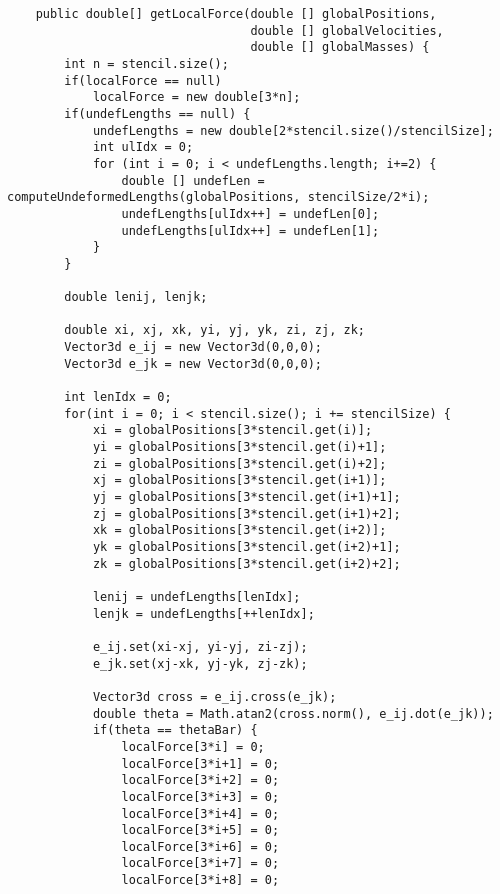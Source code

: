 \begin{lstlisting}
	public double[] getLocalForce(double [] globalPositions,
								  double [] globalVelocities,
								  double [] globalMasses) {
		int n = stencil.size();
		if(localForce == null)
			localForce = new double[3*n];
		if(undefLengths == null) {
			undefLengths = new double[2*stencil.size()/stencilSize];
			int ulIdx = 0;
			for (int i = 0; i < undefLengths.length; i+=2) {
				double [] undefLen = computeUndeformedLengths(globalPositions, stencilSize/2*i);
				undefLengths[ulIdx++] = undefLen[0];
				undefLengths[ulIdx++] = undefLen[1];
			}
		}
		
		double lenij, lenjk;
		
		double xi, xj, xk, yi, yj, yk, zi, zj, zk;
		Vector3d e_ij = new Vector3d(0,0,0);
		Vector3d e_jk = new Vector3d(0,0,0);
		
		int lenIdx = 0;
		for(int i = 0; i < stencil.size(); i += stencilSize) {
			xi = globalPositions[3*stencil.get(i)];
			yi = globalPositions[3*stencil.get(i)+1];
			zi = globalPositions[3*stencil.get(i)+2];
			xj = globalPositions[3*stencil.get(i+1)];
			yj = globalPositions[3*stencil.get(i+1)+1];
			zj = globalPositions[3*stencil.get(i+1)+2];
			xk = globalPositions[3*stencil.get(i+2)];
			yk = globalPositions[3*stencil.get(i+2)+1];
			zk = globalPositions[3*stencil.get(i+2)+2];
			
			lenij = undefLengths[lenIdx];
			lenjk = undefLengths[++lenIdx];
			
			e_ij.set(xi-xj, yi-yj, zi-zj);
			e_jk.set(xj-xk, yj-yk, zj-zk);
			
			Vector3d cross = e_ij.cross(e_jk);
			double theta = Math.atan2(cross.norm(), e_ij.dot(e_jk));
			if(theta == thetaBar) {
				localForce[3*i] = 0;
				localForce[3*i+1] = 0;
				localForce[3*i+2] = 0;
				localForce[3*i+3] = 0;
				localForce[3*i+4] = 0;
				localForce[3*i+5] = 0;
				localForce[3*i+6] = 0;
				localForce[3*i+7] = 0;
				localForce[3*i+8] = 0;
				

\end{lstlisting}
